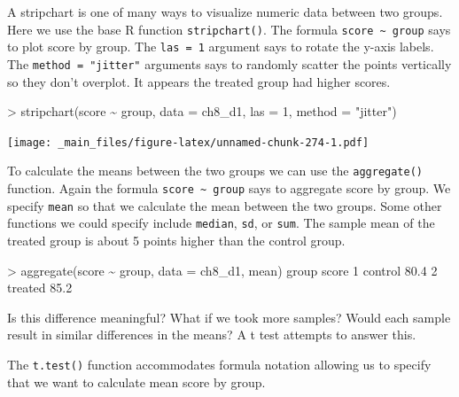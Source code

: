 \documentclass[
]{book}
\newenvironment{Shaded}{\begin{snugshade}}{\end{snugshade}}
\newcommand{\AttributeTok}[1]{\textcolor[rgb]{0.77,0.63,0.00}{#1}}
\newcommand{\DecValTok}[1]{\textcolor[rgb]{0.00,0.00,0.81}{#1}}
\newcommand{\FloatTok}[1]{\textcolor[rgb]{0.00,0.00,0.81}{#1}}
\newcommand{\FunctionTok}[1]{\textcolor[rgb]{0.00,0.00,0.00}{#1}}
\newcommand{\NormalTok}[1]{#1}
\newcommand{\SpecialCharTok}[1]{\textcolor[rgb]{0.00,0.00,0.00}{#1}}
\newcommand{\StringTok}[1]{\textcolor[rgb]{0.31,0.60,0.02}{#1}}
\begin{document}
A stripchart is one of many ways to visualize numeric data between two groups. Here we use the base R function \texttt{stripchart()}. The formula \texttt{score\ \textasciitilde{}\ group} says to plot score by group. The \texttt{las\ =\ 1} argument says to rotate the y-axis labels. The \texttt{method\ =\ "jitter"} arguments says to randomly scatter the points vertically so they don't overplot. It appears the treated group had higher scores.

\begin{Shaded}
\begin{Highlighting}[]
\SpecialCharTok{\textgreater{}} \FunctionTok{stripchart}\NormalTok{(score }\SpecialCharTok{\textasciitilde{}}\NormalTok{ group, }\AttributeTok{data =}\NormalTok{ ch8\_d1, }\AttributeTok{las =} \DecValTok{1}\NormalTok{, }\AttributeTok{method =} \StringTok{"jitter"}\NormalTok{)}
\end{Highlighting}
\end{Shaded}

\texttt{[image: \_main\_files/figure-latex/unnamed-chunk-274-1.pdf]}

To calculate the means between the two groups we can use the \texttt{aggregate()} function. Again the formula \texttt{score\ \textasciitilde{}\ group} says to aggregate score by group. We specify \texttt{mean} so that we calculate the mean between the two groups. Some other functions we could specify include \texttt{median}, \texttt{sd}, or \texttt{sum}. The sample mean of the treated group is about 5 points higher than the control group.

\begin{Shaded}
\begin{Highlighting}[]
\SpecialCharTok{\textgreater{}} \FunctionTok{aggregate}\NormalTok{(score }\SpecialCharTok{\textasciitilde{}}\NormalTok{ group, }\AttributeTok{data =}\NormalTok{ ch8\_d1, mean)}
\NormalTok{    group score}
\DecValTok{1}\NormalTok{ control  }\FloatTok{80.4}
\DecValTok{2}\NormalTok{ treated  }\FloatTok{85.2}
\end{Highlighting}
\end{Shaded}

Is this difference meaningful? What if we took more samples? Would each sample result in similar differences in the means? A t test attempts to answer this.

The \texttt{t.test()} function accommodates formula notation allowing us to specify that we want to calculate mean score by group.
\end{document}
